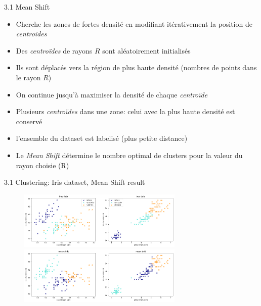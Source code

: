 \begin{frame}{3.1 Mean Shift}
  \begin{itemize}
  \item Cherche les zones de fortes densité en modifiant itérativement la position de \textit{centroïdes}
  \item Des \textit{centroïdes} de rayons $R$ sont aléatoirement initialisés
  \item Ils sont déplacés vers la région de plus haute densité (nombres de points dans le rayon $R$)
  \item On continue jusqu'à maximiser la densité de chaque \textit{centroïde}
  \item Plusieurs \textit{centroïdes} dans une zone: celui avec la plus haute densité est conservé
  \item l'ensemble du dataset est labelisé (plus petite distance)
  \item Le \textit{Mean Shift} détermine le nombre optimal de clusters pour la valeur du rayon choisie (R)
  \end{itemize}
\end{frame}

\begin{frame}{3.1 Clustering: Iris dataset, Mean Shift result}
  \begin{figure}
    \includegraphics[width=0.7\textwidth]{fig/clusteringTrue.png}
    \includegraphics[width=0.7\textwidth]{fig/clusteringMeanShift.png}
  \end{figure}
\end{frame}

